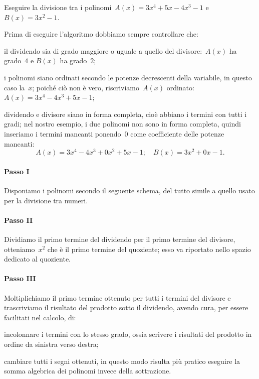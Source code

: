 \begin{exrig}
 \begin{esempio}
Eseguire la divisione tra i polinomi~$A(x)=3x^{4}+5x-4x^{3}-1$ e~$B(x)=3x^{2}-1$.

Prima di eseguire l'algoritmo dobbiamo sempre controllare che:
\begin{itemize*}
 \item il dividendo sia di grado maggiore o uguale a quello del divisore:~$A(x)$ ha grado~$4$ e $B(x)$ ha grado~$2$;
 \item i polinomi siano ordinati secondo le potenze decrescenti della variabile, in questo caso la~$x$; poiché ciò
    non è vero, riscriviamo~$A(x)$ ordinato:~$A(x)=3x^{4}-4x^{3}+5x-1$;
 \item dividendo e divisore siano in forma completa, cioè abbiano i termini con tutti i gradi; nel nostro esempio, i due polinomi non sono in
    forma completa, quindi inseriamo i termini mancanti ponendo~0 come coefficiente delle potenze mancanti:
    \[A(x)=3x^{4}-4x^{3}+0x^{2}+5x-1;\quad B(x)=3x^{2}+0x-1.\]
\end{itemize*}
\paragraph{Passo I}
 Disponiamo i polinomi secondo il seguente schema, del tutto simile a quello usato per la divisione tra numeri.
\begin{center}
 
\end{center}
\paragraph{Passo II}
 Dividiamo il primo termine del dividendo per il primo termine del divisore, otteniamo~$x^{2}$ che è il primo termine del quoziente;
 esso va riportato nello spazio dedicato al quoziente.
\begin{center}
 
\end{center}
\paragraph{Passo III}
 Moltiplichiamo il primo termine ottenuto per tutti i termini del divisore e trascriviamo il risultato del prodotto sotto il dividendo,
avendo cura, per essere facilitati nel calcolo, di:
\begin{itemize*}
\item incolonnare i termini con lo stesso grado, ossia scrivere i risultati del prodotto in ordine da sinistra verso destra;
\item cambiare tutti i segni ottenuti, in questo modo risulta più pratico eseguire la somma algebrica dei polinomi invece della sottrazione.
\end{itemize*}
\begin{center}
 
\end{center}

\end{esempio}
\end{exrig}
